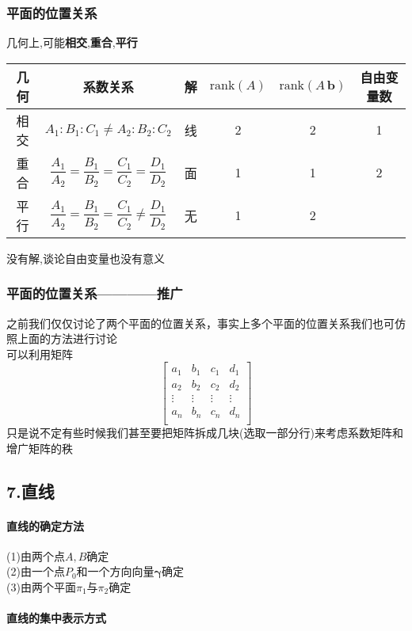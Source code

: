 \documentclass{article}
\newcommand{\ve}{\boldsymbol}
\begin{document}
\begin{CJK}{UTF8}{gkai}
\subsubsection*{平面的位置关系}
几何上,可能\textbf{相交},\textbf{重合},\textbf{平行}\\
\renewcommand{\arraystretch}{2}
\begin{tabular}{|c|c|c|c|c|c|}
    \hline
    几何 & 系数关系&解&$\text{rank}(A)$&$\text{rank}(A\, \ve{b})$&自由变量数 \\
    \hline
    相交 & $A_1:B_1:C_1\neq A_2:B_2:C_2$ & 线 & 2 & 2 & 1 \\
    \hline
    重合 & $\dfrac{A_1}{A_2}=\dfrac{B_1}{B_2}=\dfrac{C_1}{C_2}=\dfrac{D_1}{D_2}$ & 面 & 1 & 1 & 2 \\
    \hline
    平行 & $\dfrac{A_1}{A_2}=\dfrac{B_1}{B_2}=\dfrac{C_1}{C_2}\neq\dfrac{D_1}{D_2}$ & 无 & 1 & 2 &\\
    \hline
  \end{tabular}
没有解,谈论自由变量也没有意义\\
\renewcommand{\arraystretch}{1}
\subsubsection*{平面的位置关系————推广}
之前我们仅仅讨论了两个平面的位置关系，事实上多个平面的位置关系我们也可仿照上面的方法进行讨论\\
可以利用矩阵
\[\begin{bmatrix}
    a_1&b_1&c_1&d_1\\
    a_2&b_2&c_2&d_2\\
    \vdots&\vdots&\vdots&\vdots\\
    a_n&b_n&c_n&d_n\\
\end{bmatrix}\]
只是说不定有些时候我们甚至要把矩阵拆成几块(选取一部分行)来考虑系数矩阵和增广矩阵的秩\\
\subsection*{7.直线}
\paragraph{直线的确定方法\\}
(1)由两个点$A,B$确定\\
(2)由一个点$P_0$和一个方向向量$\ve{\gamma}$确定\\
(3)由两个平面$\pi_1$与$\pi_2$确定\\
\paragraph{直线的集中表示方式\\}

\end{CJK}
\end{document}
